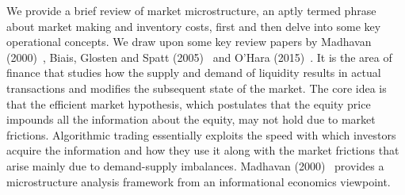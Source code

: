 We provide a brief review of market microstructure, an aptly termed phrase about market making and inventory costs,\label{in:tradecost1} first and then delve into some key operational concepts. We draw upon some key review papers by Madhavan (2000)~\cite{madhavan2000}, Biais, Glosten and Spatt (2005)~\cite{bgs05} and O'Hara (2015)~\cite{ohara15hfmm}. It is the area of finance that studies how the supply and demand of liquidity results in actual transactions and modifies the subsequent state of the market. The core idea is that the efficient market hypothesis,\label{in:efficient} which postulates that the equity price impounds all the information about the equity, may not hold due to market frictions. Algorithmic trading essentially exploits the speed with which investors acquire the information and how they use it along with the market frictions that arise mainly due to demand-supply imbalances. Madhavan (2000)~\cite{madhavan2000} provides a microstructure analysis framework from an informational economics viewpoint. 


